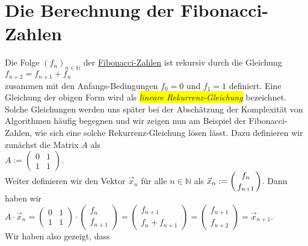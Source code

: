 \section{Die Berechnung der Fibonacci-Zahlen}
Die Folge $(f_n)_{n\in\mathbb{N}}$ der \href{http://de.wikipedia.org/wiki/Fibonacci-Folge}{Fibonacci-Zahlen} ist rekursiv durch die Gleichung
\\[0.2cm]
\hspace*{1.3cm}
$f_{n+2} = f_{n+1} + f_n$
\\[0.2cm]
zusammen mit den Anfangs-Bedingungen $f_0 = 0$ und $f_1 = 1$ definiert.   Eine Gleichung der obigen Form
wird als \colorbox{yellow}{\emph{lineare Rekurrenz-Gleichung}} bezeichnet.  Solche Gleichungen werden uns sp\"ater bei
der Absch\"atzung der Komplexit\"at von Algorithmen h\"aufig begegnen und wir zeigen nun am Beispiel der
Fibonacci-Zahlen, wie sich eine solche Rekurrenz-Gleichung l\"osen l\"asst.  Dazu definieren wir
zun\"achst die Matrix $A$ als
\\[0.2cm]
\hspace*{1.3cm}
$A := \left(
  \begin{array}{ll}
    0 & 1 \\
    1 & 1 
  \end{array}
\right)
$.
\\[0.2cm]
Weiter definieren wir den Vektor $\vec{x}_n$ f\"ur alle $n \in \mathbb{N}$ als 
$\displaystyle\vec{x}_n := \left(f_n \atop f_{n+1}\right)$.  Dann haben wir
\\[0.2cm]
\hspace*{1.3cm}
$A \cdot \vec{x}_n = \left(
  \begin{array}{ll}
    0 & 1 \\
    1 & 1 
  \end{array}
\right) \cdot \left(
  \begin{array}{c}
    f_n \\ f_{n+1}
  \end{array} 
\right) = 
\left(
  \begin{array}{c}
     f_{n+1} \\ f_n + f_{n+1}
  \end{array} 
\right) = \left(
  \begin{array}{c}
     f_{n+1} \\ f_{n+2}
  \end{array} 
\right) = \vec{x}_{n+1}.
$
\\[0.2cm]
Wir haben also gezeigt, dass
\\[0.2cm]
\hspace*{1.3cm}
